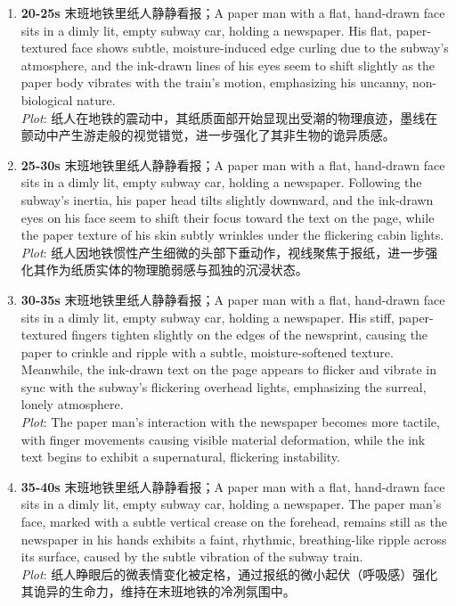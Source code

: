\documentclass[11pt,a4paper]{article}
\begin{document}
\begin{enumerate}
\item \textbf{20-25s} 末班地铁里纸人静静看报；A paper man with a flat, hand-drawn face sits in a dimly lit, empty subway car, holding a newspaper. His flat, paper-textured face shows subtle, moisture-induced edge curling due to the subway's atmosphere, and the ink-drawn lines of his eyes seem to shift slightly as the paper body vibrates with the train's motion, emphasizing his uncanny, non-biological nature.\\\newline \textit{Plot}: 纸人在地铁的震动中，其纸质面部开始显现出受潮的物理痕迹，墨线在颤动中产生游走般的视觉错觉，进一步强化了其非生物的诡异质感。
\item \textbf{25-30s} 末班地铁里纸人静静看报；A paper man with a flat, hand-drawn face sits in a dimly lit, empty subway car, holding a newspaper. Following the subway's inertia, his paper head tilts slightly downward, and the ink-drawn eyes on his face seem to shift their focus toward the text on the page, while the paper texture of his skin subtly wrinkles under the flickering cabin lights.\\\newline \textit{Plot}: 纸人因地铁惯性产生细微的头部下垂动作，视线聚焦于报纸，进一步强化其作为纸质实体的物理脆弱感与孤独的沉浸状态。
\item \textbf{30-35s} 末班地铁里纸人静静看报；A paper man with a flat, hand-drawn face sits in a dimly lit, empty subway car, holding a newspaper. His stiff, paper-textured fingers tighten slightly on the edges of the newsprint, causing the paper to crinkle and ripple with a subtle, moisture-softened texture. Meanwhile, the ink-drawn text on the page appears to flicker and vibrate in sync with the subway's flickering overhead lights, emphasizing the surreal, lonely atmosphere.\\\newline \textit{Plot}: The paper man's interaction with the newspaper becomes more tactile, with finger movements causing visible material deformation, while the ink text begins to exhibit a supernatural, flickering instability.
\item \textbf{35-40s} 末班地铁里纸人静静看报；A paper man with a flat, hand-drawn face sits in a dimly lit, empty subway car, holding a newspaper. The paper man's face, marked with a subtle vertical crease on the forehead, remains still as the newspaper in his hands exhibits a faint, rhythmic, breathing-like ripple across its surface, caused by the subtle vibration of the subway train.\\\newline \textit{Plot}: 纸人睁眼后的微表情变化被定格，通过报纸的微小起伏（呼吸感）强化其诡异的生命力，维持在末班地铁的冷冽氛围中。

\end{enumerate}
\end{document}
